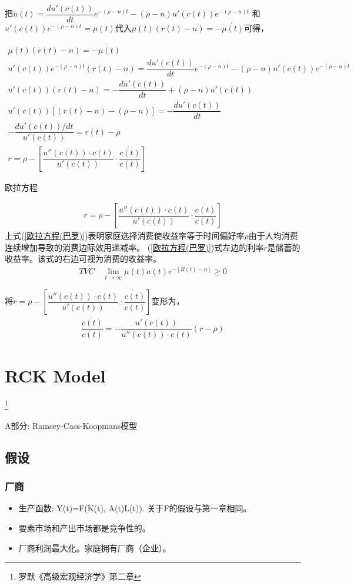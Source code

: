 把$ \dot{u(t)}=\dfrac{d u'(c(t))}{dt}e^{-(\rho-n)t}-(\rho-n)u'(c(t))e^{-(\rho-n)t} $	和$ u'(c(t))e^{-(\rho-n)t}=\mu(t) $代入$ \mu(t)(r(t)-n)	=-\dot{\mu(t)} $可得，


\begin{gather}
	\mu(t)(r(t)-n)	=-\dot{\mu(t)}
	\\
  u'(c(t))e^{-(\rho-n)t}\left(r(t)-n\right)=\dfrac{d u'(c(t))}{dt}e^{-(\rho-n)t}-(\rho-n)u'(c(t))e^{-(\rho-n)t}
  \\
  u'(c(t))(r(t)-n)=-\dfrac{d u'(c(t))}{dt}+(\rho-n)u'(c(t))
  \\
  u'(c(t))[(r(t)-n)-(\rho-n)]=-\dfrac{d u'(c(t))}{dt}
  \\
  -\dfrac{d u'(c(t))/dt}{u'(c(t))}=r(t)-\rho
  \\
  r=\rho-\left[\dfrac{u''(c(t))\cdot c(t)}{u'(c(t))}\cdot\dfrac{\dot{c(t)}}{c(t)}\right]
\end{gather}

欧拉方程

\begin{gather}\label{欧拉方程(巴罗)}
	r=\rho-\left[\dfrac{u''(c(t))\cdot c(t)}{u'(c(t))}\cdot\dfrac{\dot{c(t)}}{c(t)}\right]
\end{gather}
上式(\ref{欧拉方程(巴罗)})表明家庭选择消费使收益率等于时间偏好率$ \rho $由于人均消费连续增加导致的消费边际效用递减率。
   (\ref{欧拉方程(巴罗)})式左边的利率$ r $是储蓄的收益率。该式的右边可视为消费的收益率。
\begin{align}\label{1.27}
  	TVC \quad \lim\limits_{t\to \infty}\mu(t)a(t)e^{-[R(t)-n]}\ge 0
\end{align}

将$ r=\rho-\left[\dfrac{u''(c(t))\cdot c(t)}{u'(c(t))}\cdot\dfrac{\dot{c(t)}}{c(t)}\right] $变形为，
\begin{gather}
\dfrac{\dot{c(t)}}{c(t)}=-\dfrac{u'(c(t))}{u''(c(t))\cdot c(t)}(r-\rho)	
\end{gather}



\chapter{RCK Model}
\footnote{罗默《高级宏观经济学》第二章}


A部分: Ramsey-Cass-Koopmans模型

\section{ 假设}

\subsection{厂商}
\begin{itemize}
\item 生产函数: Y(t)=F(K(t), A(t)L(t)). 关于F的假设与第一章相同。
\item 要素市场和产出市场都是竞争性的。
\item 厂商利润最大化。家庭拥有厂商（企业）。	
\end{itemize}
 

